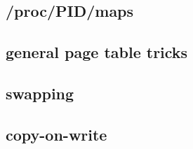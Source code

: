 \subsection{/proc/PID/maps}


\subsection{general page table tricks}


\subsection{swapping}





\subsection{copy-on-write}

